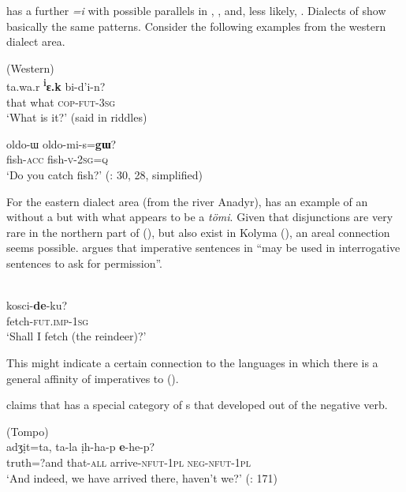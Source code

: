  has a further  \textit{=i} \citep[138]{Malchukov2008} with possible parallels in , , and, less likely, . Dialects of  show basically the same  patterns. Consider the following examples from the western dialect area.

\ea%
    \label{ex:tungu:13}
    (Western)\\
    \ea
    \gll ta.wa.r \textbf{{\textsuperscript{i}}}\textbf{{ɛ.k}} bi-d’i-n?\\
    that    what  \textsc{cop}-\textsc{fut}-3\textsc{sg}\\
    \glt ‘What is it?’ (said in riddles)
    
    \ex
    \gll oldo-ɯ    oldo-mi-s=\textbf{{gɯ}}?\\
    fish-\textsc{acc}  fish-\textsc{v}-2\textsc{sg}=\textsc{q}\\
    \glt ‘Do you catch fish?’ (\citealt{Sotavalta1978}: 30, 28, simplified)
    \z
    \z

For the eastern dialect area (from the river Anadyr), \citet[217]{Schiefner1874} has an example of an  without a  but with what appears to be a  \textit{tömi}. Given that disjunctions are very rare in the northern part of  (), but also exist in Kolyma  (), an areal connection seems possible. \citet[179]{Malchukov2001} argues that imperative sentences in  “may be used in interrogative sentences to ask for permission”.

\ea%
    \label{ex:tungu:14}
    \\
    \gll kosci-\textbf{{de}}{-ku?}\\
    fetch-\textsc{fut}.\textsc{imp}-1\textsc{sg}\\
    \glt ‘Shall I fetch (the reindeer)?’ \citep[165]{Malchukov2001}
    \z

\noindent This might indicate a certain connection to the  languages in which there is a general affinity of imperatives to  ().

\cite{Matić2016} claims that  has a special category of s that developed out of the negative verb.

\ea%
    \label{ex:tungu:15}
     (Tompo)\\
    \gll adʒịt=ta,  ta-la    ịh-ha-p \textbf{{e}}{-he-p?}\\
    truth=?and  that-\textsc{all}  arrive-\textsc{nfut}-1\textsc{pl}  \textsc{neg}-\textsc{nfut}-1\textsc{pl}\\
    \glt ‘And indeed, we have arrived there, haven’t we?’ (\citealt{Matić2016}: 171)
    \z

